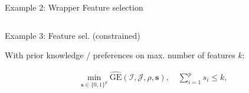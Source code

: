 \documentclass[11pt,compress,t,notes=noshow, xcolor=table]{beamer}
\begin{document}
\begin{vbframe}{Example 2: Wrapper Feature selection}
\begin{columns}
\begin{column}{0.5\textwidth}
\begin{center}
\end{center}
\end{column}
\end{columns}



\end{vbframe}

\begin{vbframe}{Example 3: Feature sel. (constrained)}

With prior knowledge / preferences on max. number of features $k$:

\begin{eqnarray*}
\min_{\textbf{s} \in \{0, 1\}^p} \widehat{\text{GE}}(\mathcal{I}, \mathcal{J}, \rho, \bm{s}), \quad \sum\nolimits_{i = 1}^p s_i \le k, 
\end{eqnarray*}



\end{vbframe}
\end{document}
